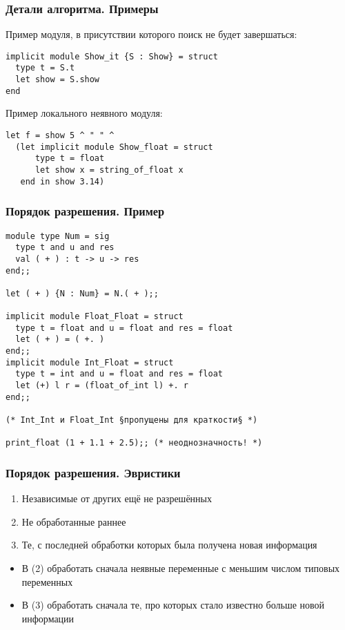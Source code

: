 \documentclass{beamer}
\begin{document}
\lstset{language=caml}
\begin{frame}[fragile]\frametitle{Детали алгоритма. Примеры}
Пример модуля, в присутствии которого поиск не будет завершаться:
\begin{lstlisting}
implicit module Show_it {S : Show} = struct
  type t = S.t
  let show = S.show
end
\end{lstlisting}
Пример локального неявного модуля:
\begin{lstlisting}
let f = show 5 ^ " " ^
  (let implicit module Show_float = struct
      type t = float
      let show x = string_of_float x
   end in show 3.14)
\end{lstlisting}
\end{frame}

\lstset{language=caml}
\begin{frame}[fragile]\frametitle{Порядок разрешения. Пример}
\begin{lstlisting}
module type Num = sig
  type t and u and res
  val ( + ) : t -> u -> res
end;;

let ( + ) {N : Num} = N.( + );;

implicit module Float_Float = struct
  type t = float and u = float and res = float
  let ( + ) = ( +. )
end;;
implicit module Int_Float = struct
  type t = int and u = float and res = float
  let (+) l r = (float_of_int l) +. r
end;;

(* Int_Int и Float_Int §пропущены для краткости§ *)

print_float (1 + 1.1 + 2.5);; (* неоднозначность! *)
\end{lstlisting}
\end{frame}

\lstset{language=caml}
\begin{frame}[fragile]\frametitle{Порядок разрешения. Эвристики}
\begin{enumerate}
    \item Независимые от других ещё не разрешённых
    \item Не обработанные раннее
    \item Те, с последней обработки которых была получена новая информация
  \end{enumerate}
\begin{itemize}
  \item В (2) обработать сначала неявные переменные с меньшим числом типовых переменных
  \item В (3) обработать сначала те, про которых стало известно больше новой информации
\end{itemize}
\end{frame}
\end{document}
